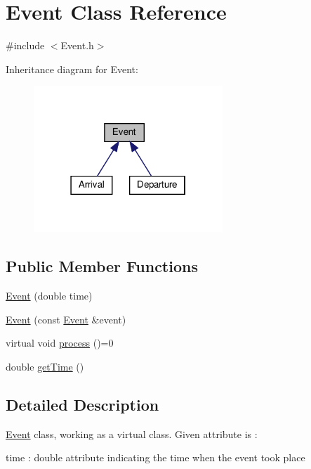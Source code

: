 \hypertarget{classEvent}{}\section{Event Class Reference}
\label{classEvent}


{\ttfamily \#include $<$Event.\+h$>$}



Inheritance diagram for Event\+:\nopagebreak
\begin{figure}[H]
\begin{center}
\leavevmode
\includegraphics[width=202pt]{classEvent__inherit__graph}
\end{center}
\end{figure}
\subsection*{Public Member Functions}
\begin{DoxyCompactItemize}
\item 
\hyperlink{classEvent_aebd4c54256dbf46040053babdfcdf987}{Event} (double time)
\item 
\hyperlink{classEvent_ae8b35bf9237b74824194f87128e4fdab}{Event} (const \hyperlink{classEvent}{Event} \&event)
\item 
virtual void \hyperlink{classEvent_af1940e82c4da67c8119f0dfe026949b4}{process} ()=0
\item 
double \hyperlink{classEvent_ab05b23f7cc8d126efcbf189062f3b275}{get\+Time} ()
\end{DoxyCompactItemize}


\subsection{Detailed Description}
\hyperlink{classEvent}{Event} class, working as a virtual class. Given attribute is \+:
\begin{DoxyItemize}
\item time \+: double attribute indicating the time when the event took place 
\end{DoxyItemize}

